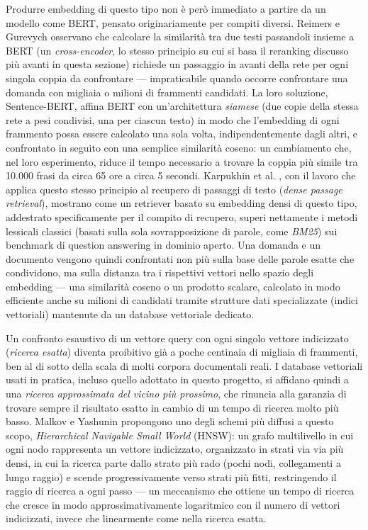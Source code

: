 Produrre embedding di questo tipo non è però immediato a partire da un modello come BERT, pensato originariamente per
compiti diversi. Reimers e Gurevych \cite{reimers2019sbert} osservano che calcolare la similarità tra due testi
passandoli insieme a BERT (un \emph{cross-encoder}, lo stesso principio su cui si basa il reranking discusso più
avanti in questa sezione) richiede un passaggio in avanti della rete per ogni singola coppia da confrontare ---
impraticabile quando occorre confrontare una domanda con migliaia o milioni di frammenti candidati. La loro
soluzione, Sentence-BERT, affina BERT con un'architettura \emph{siamese} (due copie della stessa rete a pesi
condivisi, una per ciascun testo) in modo che l'embedding di ogni frammento possa essere calcolato una sola volta,
indipendentemente dagli altri, e confrontato in seguito con una semplice similarità coseno: un cambiamento che, nel
loro esperimento, riduce il tempo necessario a trovare la coppia più simile tra 10.000 frasi da circa 65 ore a circa
5 secondi. Karpukhin et al. \cite{karpukhin2020dpr}, con il lavoro che applica questo stesso principio al recupero di
passaggi di testo (\emph{dense passage retrieval}), mostrano come un retriever basato su embedding densi di questo
tipo, addestrato specificamente per il compito di recupero, superi nettamente i metodi lessicali classici (basati
sulla sola sovrapposizione di parole, come \emph{BM25}) sui benchmark di question answering in dominio aperto. Una
domanda e un documento vengono quindi confrontati non più sulla base delle parole esatte che condividono, ma sulla
distanza tra i rispettivi vettori nello spazio degli embedding --- una similarità coseno o un prodotto scalare,
calcolato in modo efficiente anche su milioni di candidati tramite strutture dati specializzate (indici vettoriali)
mantenute da un database vettoriale dedicato.

Un confronto esaustivo di un vettore query con ogni singolo vettore indicizzato (\emph{ricerca esatta}) diventa
proibitivo già a poche centinaia di migliaia di frammenti, ben al di sotto della scala di molti corpora documentali
reali. I database vettoriali usati in pratica, incluso quello adottato in questo progetto, si affidano quindi a una
\emph{ricerca approssimata del vicino più prossimo}, che rinuncia alla garanzia di trovare sempre il risultato
esatto in cambio di un tempo di ricerca molto più basso. Malkov e Yashunin \cite{malkov2018hnsw} propongono uno degli
schemi più diffusi a questo scopo, \emph{Hierarchical Navigable Small World} (HNSW): un grafo multilivello in cui ogni
nodo rappresenta un vettore indicizzato, organizzato in strati via via più densi, in cui la ricerca parte dallo
strato più rado (pochi nodi, collegamenti a lungo raggio) e scende progressivamente verso strati più fitti,
restringendo il raggio di ricerca a ogni passo --- un meccanismo che ottiene un tempo di ricerca che cresce in modo
approssimativamente logaritmico con il numero di vettori indicizzati, invece che linearmente come nella ricerca
esatta.

